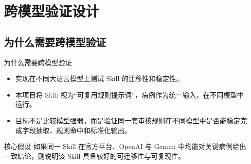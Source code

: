 
\section{跨模型验证设计}


\newcommand{\pass}{\textcolor{passgreen}{通过}}
\newcommand{\partialpass}{\textcolor{warnorange}{部分通过}}
\newcommand{\failcase}{\textcolor{riskred}{未通过}}

\newcommand{\screenshotplaceholder}[2]{
  \begin{center}
    \fbox{
      \begin{minipage}[c][0.46\textheight][c]{0.88\textwidth}
        \centering
        \vspace{0.3cm}
        {\Large #1}\\[0.4em]
        {\small #2}\\[0.2em]
        {\scriptsize 后续将此处替换为实际模型输出截图}
        \vspace{0.3cm}
      \end{minipage}
    }
  \end{center}
}

\subsection{为什么需要跨模型验证}
\begin{frame}[fragile]{为什么需要跨模型验证}
  \begin{itemize}
    \item 实现在不同大语言模型上测试 Skill 的迁移性和稳定性。
    \item 本项目将 Skill 视为“可复用规则提示词”，病例作为统一输入，在不同模型中运行。
    \item 目标不是比较模型强弱，而是验证同一套审核规则在不同模型中是否能稳定完成字段抽取、规则命中和标准化输出。
  \end{itemize}

  \vspace{0.4cm}
  \begin{block}{核心假设}
    如果同一 Skill 在官方平台、OpenAI 与 Gemini 中均能对关键病例给出一致结论，则说明该 Skill 具备较好的可迁移性与可复现性。
  \end{block}
\end{frame}

